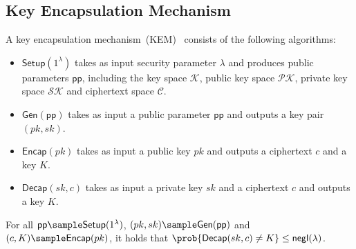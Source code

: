 \documentclass[a4paper,11pt]{article}
\newtheorem{defn}{Definition}[]
\newcommand{\setup}{\mathsf{Setup}}
\newcommand{\negli}{\mathsf{negl}}
\newcommand{\ppp}{\mathsf{pp}}
\newcommand{\gen}{\mathsf{Gen}}
\begin{document}
\begin{sloppypar}

\subsection{Key Encapsulation Mechanism}
\label{kem def}
A key encapsulation mechanism~(KEM)~\cite{EPRINT:Shoup01} consists of the following algorithms:
\begin{itemize}[itemsep=0pt, topsep=0pt, parsep=0pt]
   \item $\setup(1^{\lambda})$ takes as input security parameter $\lambda$ and produces public parameters $\mathsf{pp}$, including the key space $\mathcal{K}$, public key space $\mathcal{PK}$, private key space $\mathcal{SK}$ and ciphertext space $\mathcal{C}$.
   \item $\mathsf{Gen}(\mathsf{pp})$ takes as input a public parameter $\mathsf{pp}$ and outputs a key pair $(pk,sk)$.
   \item $\mathsf{Encap}(pk)$ takes as input a public key $pk$ and outputs a ciphertext $c$ and a key $K$.
   \item $\mathsf{Decap}(sk,c)$ takes as input a private key $sk$ and a ciphertext $c$ and outputs a key $K$.
\end{itemize}

For all $\ppp\sample \setup(1^{\lambda})$, $(pk,sk)\sample \gen(\ppp)$ and $(c,K)\sample \mathsf{Encap}(pk)$, it holds that $\prob{\mathsf{Decap}(sk,c)\neq K}\leq \negli(\lambda)$.


\end{sloppypar}
\end{document}
